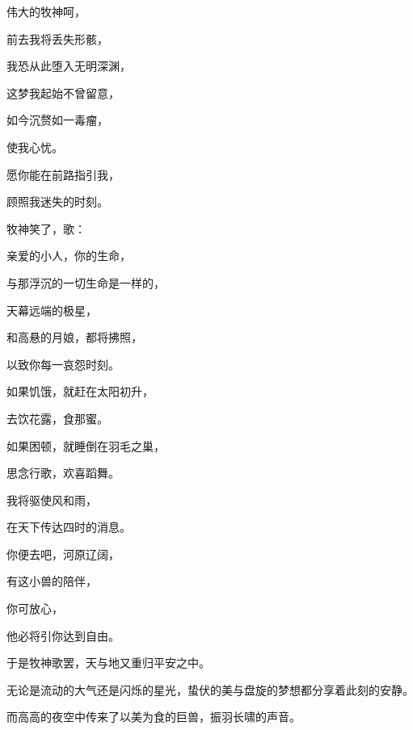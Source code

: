 \documentclass[UTF8]{article}
\begin{document}
\par 伟大的牧神呵，
\par 前去我将丢失形骸，
\par 我恐从此堕入无明深渊，
\par 这梦我起始不曾留意，
\par 如今沉赘如一毒瘤，
\par 使我心忧。
\par 愿你能在前路指引我，
\par 顾照我迷失的时刻。
\\[0.6cm]
\par 牧神笑了，歌：
\\[0.6cm]
\par 亲爱的小人，你的生命，
\par 与那浮沉的一切生命是一样的，
\par 天幕远端的极星，
\par 和高悬的月娘，都将拂照，
\par 以致你每一哀怨时刻。
\par 如果饥饿，就赶在太阳初升，
\par 去饮花露，食那蜜。
\par 如果困顿，就睡倒在羽毛之巢，
\par 思念行歌，欢喜蹈舞。
\par 我将驱使风和雨，
\par 在天下传达四时的消息。
\par 你便去吧，河原辽阔，
\par 有这小兽的陪伴，
\par 你可放心，
\par 他必将引你达到自由。
\\[0.6cm]
\par 于是牧神歌罢，天与地又重归平安之中。
\par 无论是流动的大气还是闪烁的星光，蛰伏的美与盘旋的梦想都分享着此刻的安静。
\par 而高高的夜空中传来了以美为食的巨兽，振羽长啸的声音。
\end{document}
